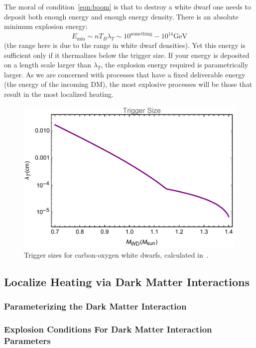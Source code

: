 \documentclass[11 pt,preprint,preprintnumbers,amsmath,amssymb, prd]{revtex4}
\newcommand{\GeV}{\text{GeV}}
\begin{document}
The moral of condition~\ref{eqn:boom} is that to destroy a white dwarf one needs to deposit both enough energy and enough energy density.  There is an absolute minimum explosion energy:
\[
    E_{\text{min}} \sim n T_B \lambda_T \sim 10^{\text{something}} - 10^{14} \GeV
\]
(the range here is due to the range in white dwarf densities).  Yet this energy is sufficient only if it thermalizes below the trigger size.  If your energy is deposited on a length scale larger than $\lambda_T$, the explosion energy required is parametrically larger. As we are concerned with processes that have a fixed deliverable energy (the energy of the incoming DM), the most explosive processes will be those that result in the most localized heating.

\begin{figure}
\includegraphics[scale=.45]{triggerboom.pdf}
\caption{Trigger sizes for carbon-oxygen white dwarfs, calculated in~\cite{Graham:2015apa}.}
\label{fig:triggerboom}
\end{figure}

\subsection{Localize Heating via Dark Matter Interactions}

\subsubsection{Parameterizing the Dark Matter Interaction}

\subsubsection{Explosion Conditions For Dark Matter Interaction Parameters}
\end{document}
